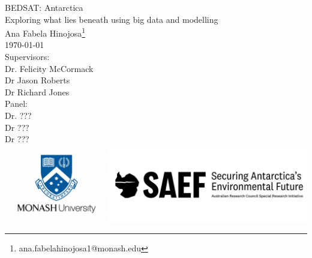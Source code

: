 \documentclass[12pt, a4paper, openany]{book}
\newenvironment{abstract}
{\clearpage \thispagestyle{empty} \null \vfill \begin{center} \bfseries \large Abstract \end{center}}
{\vfill \null \clearpage}
\begin{document}
\begin{titlepage}
\begin{center}
    {\Huge BEDSAT: Antarctica}\\ [1cm] 
    {\Large Exploring what lies beneath using big data and modelling}\\
    \vspace{5cm}
    {\large Ana Fabela Hinojosa\footnote{ana.fabelahinojosa1@monash.edu}}\\
    \monthyeardate\today\\ [1cm]
    Supervisors:\\
    Dr. Felicity McCormack\\
    Dr Jason Roberts\\
    Dr Richard Jones\\ [2cm]
    Panel:\\
    Dr. ??? \\
    Dr ??? \\
    Dr ??? \\ [3.5cm]
    \includegraphics[scale=0.2]{logos.png}

    \end{center}

\end{titlepage}




\end{document}
